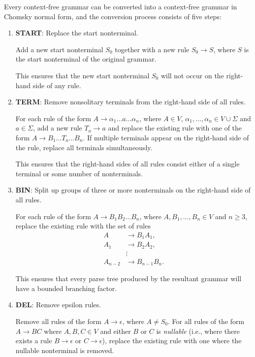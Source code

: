 Every context-free grammar can be converted into a context-free grammar in Chomsky normal form, and the conversion process consists of five steps:
\begin{colouredbox}
\begin{enumerate}
\item \textbf{START}: Replace the start nonterminal.

Add a new start nonterminal $S_{0}$ together with a new rule $S_{0} \rightarrow S$, where $S$ is the start nonterminal of the original grammar.

This ensures that the new start nonterminal $S_{0}$ will not occur on the right-hand side of any rule.

\item \textbf{TERM}: Remove nonsolitary terminals from the right-hand side of all rules.

For each rule of the form $A \rightarrow \alpha_{1} \dots a \dots \alpha_{n}$, where $A \in V$, $\alpha_{1}, \dots, \alpha_{n} \in V \cup \Sigma$ and $a \in \Sigma$, add a new rule $T_{a} \rightarrow a$ and replace the existing rule with one of the form $A \rightarrow B_{1} \dots T_{a} \dots B_{n}$. If multiple terminals appear on the right-hand side of the rule, replace all terminals simultaneously.

This ensures that the right-hand sides of all rules consist either of a single terminal or some number of nonterminals.

\item \textbf{BIN}: Split up groups of three or more nonterminals on the right-hand side of all rules.

For each rule of the form $A \rightarrow B_{1}B_{2} \dots B_{n}$, where $A, B_{1}, \dots, B_{n} \in V$ and $n \geq 3$, replace the existing rule with the set of rules
\begin{align*}
A		&\rightarrow B_{1}A_{1}, \\
A_{1}	&\rightarrow B_{2}A_{2}, \\
		&\vdots \\
A_{n-2}	&\rightarrow B_{n-1}B_{n}.
\end{align*}

This ensures that every parse tree produced by the resultant grammar will have a bounded branching factor.

\item \textbf{DEL}: Remove epsilon rules.

Remove all rules of the form $A \rightarrow \epsilon$, where $A \neq S_{0}$. For all rules of the form $A \rightarrow BC$ where $A, B, C \in V$ and either $B$ or $C$ is \emph{nullable} (i.e., where there exists a rule $B \rightarrow \epsilon$ or $C \rightarrow \epsilon$), replace the existing rule with one where the nullable nonterminal is removed.


\end{enumerate}
\end{colouredbox}

